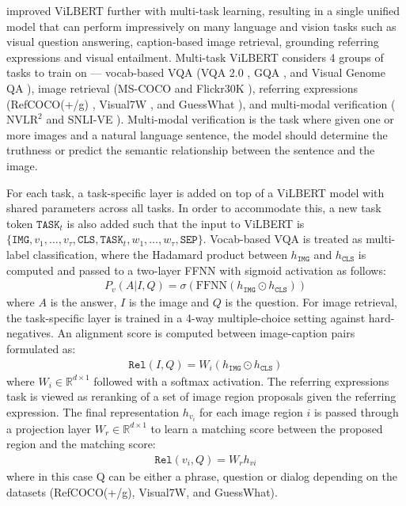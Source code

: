 \documentclass{article}
\begin{document}
\citet{lu2020multitask} improved ViLBERT further with multi-task learning, resulting in a single unified model that can perform impressively on many language and vision tasks such as visual question answering, caption-based image retrieval, grounding referring expressions and visual entailment. Multi-task ViLBERT considers 4 groups of tasks to train on --- vocab-based VQA (VQA 2.0 \citep{goyal2017vqa2}, GQA \citep{hudson2019gqa}, and Visual Genome QA \citep{krishnavisualgenome}), image retrieval (MS-COCO \citep{coco} and Flickr30K \citep{plummer2015vdg}), referring expressions (RefCOCO(+/g) \citep{kazemzadeh-etal-2014-referitgame, maorefcoco}, Visual7W \citep{zhu2016cvpr}, and GuessWhat \citep{guesswhat_game}), and multi-modal verification ($\text{NVLR}^2$ \citep{suhr-etal-2019-corpus} and  SNLI-VE \citep{xie2018visual}). Multi-modal verification is the task where given one or more images and a natural language sentence, the model should determine the truthness or predict the semantic relationship between the sentence and the image. 

For each task, a task-specific layer is added on top of a ViLBERT model with shared parameters across all tasks. In order to accommodate this, a new task token $\mathtt{TASK}_{t}$ is also added such that the input to ViLBERT is $\{\mathtt{IMG}, v_{1}, \dots, v_{\tau}, \mathtt{CLS}, \mathtt{TASK}_{t}, w_{1}, \dots, w_{\tau}, \mathtt{SEP}\}$. Vocab-based VQA is treated as multi-label classification, where the Hadamard product between $h_{\mathtt{IMG}}$ and $h_{\mathtt{CLS}}$ is computed and passed to a two-layer FFNN with sigmoid activation as follows:
\begin{align}
    P_{v}(A|I, Q) = \sigma(\text{FFNN}(h_{\mathtt{IMG}} \odot h_{\mathtt{CLS}}))
\end{align}
where $A$ is the answer, $I$ is the image and $Q$ is the question. For image retrieval, the task-specific layer is trained in a 4-way multiple-choice setting against hard-negatives. An alignment score is computed between image-caption pairs formulated as:
\begin{align}
    \mathtt{Rel}(I,Q) = W_{i}(h_{\mathtt{IMG}} \odot h_{\mathtt{CLS}})
\end{align}
where $W_{i} \in \mathbb{R}^{d \times 1}$ followed with a softmax activation. The referring expressions task is viewed as reranking of a set of image region proposals given the referring expression. The final representation $h_{v_{i}}$ for each image region $i$ is passed through a projection layer $W_{r} \in \mathbb{R}^{d \times 1}$ to learn a matching score between the proposed region and the matching score: 
\begin{align}
    \mathtt{Rel}(v_{i}, Q) = W_{r}h_{vi}
\end{align}
where in this case Q can be either a phrase, question or dialog depending on the datasets (RefCOCO(+/g), Visual7W, and GuessWhat). 
\end{document}

